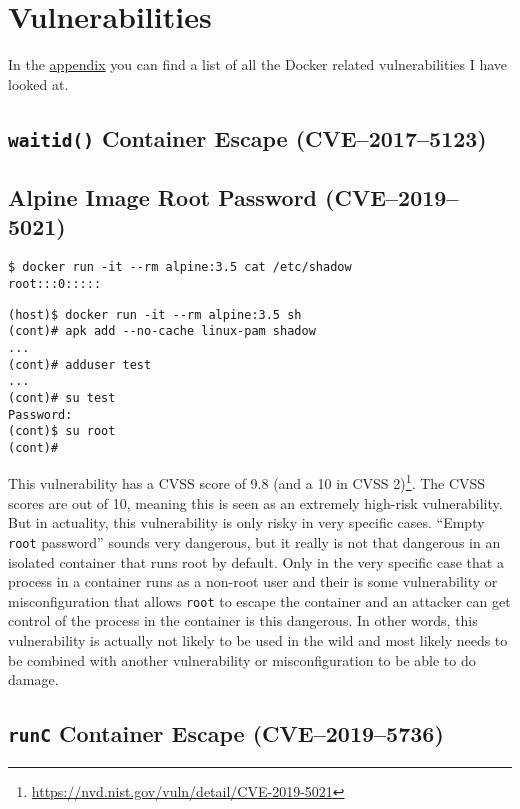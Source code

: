 \section{Vulnerabilities}

In the \hyperref[appendix:CVE-List]{appendix} you can find a list of all the Docker related vulnerabilities I have looked at.

\subsection{\texorpdfstring{\lstinline{waitid()}}{waitid()} Container Escape (CVE--2017--5123)}

\subsection{Alpine Image Root Password (CVE--2019--5021)}
\begin{lstlisting}
$ docker run -it --rm alpine:3.5 cat /etc/shadow
root:::0:::::
\end{lstlisting}

\begin{lstlisting}
(host)$ docker run -it --rm alpine:3.5 sh
(cont)# apk add --no-cache linux-pam shadow
...
(cont)# adduser test
...
(cont)# su test
Password:
(cont)$ su root
(cont)#
\end{lstlisting}

This vulnerability has a CVSS score of 9.8 (and a 10 in CVSS 2)\footnote{\url{https://nvd.nist.gov/vuln/detail/CVE-2019-5021}}. The CVSS scores are out of 10, meaning this is seen as an extremely high-risk vulnerability. But in actuality, this vulnerability is only risky in very specific cases. ``Empty \lstinline{root} password'' sounds very dangerous, but it really is not that dangerous in an isolated container that runs root by default. Only in the very specific case that a process in a container runs as a non-root user and their is some vulnerability or misconfiguration that allows \lstinline{root} to escape the container and an attacker can get control of the process in the container is this dangerous. In other words, this vulnerability is actually not likely to be used in the wild and most likely needs to be combined with another vulnerability or misconfiguration to be able to do damage.

\subsection{\texorpdfstring{\lstinline{runC}}{runC} Container Escape (CVE--2019--5736)}
